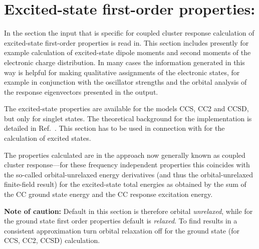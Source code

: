 
\section{Excited-state first-order properties: }\label{sec:ccexgr}

In the  section the input that is specific for coupled cluster 
response calculation of excited-state first-order properties is read in.
This section includes presently for example calculation of excited-state 
dipole moments and second moments of the electronic charge distribution.
In many cases the information generated in this way is helpful 
for making qualitative assignments of the electronic states, for example
in conjunction with the oscillator strengths and the 
orbital analysis of the response eigenvectors presented in the output.

The excited-state properties are available for the models CCS, CC2 and CCSD,
but only for singlet states.
The theoretical background for the implementation is detailed in Ref.\ \cite{Christiansen:CCLR,Christiansen:QEL}.
This section has to be used in connection with  for the calculation of excited states.

The properties calculated are in the approach now generally known as coupled cluster
response---for these frequency independent properties this coincides with the so-called
orbital-unrelaxed energy derivatives (and thus the orbital-unrelaxed finite-field result)
for the excited-state total energies as obtained by the sum of the CC ground state energy
and the CC response excitation energy.

{\bf Note of caution:}
Default in this section is therefore orbital {\it unrelaxed}, while for the ground state 
first order properties  default is {\it relaxed}. 
To find results in a consistent approximation turn orbital relaxation off
for the ground state (for CCS, CC2, CCSD) calculation.

\begin{center}
\end{center}

